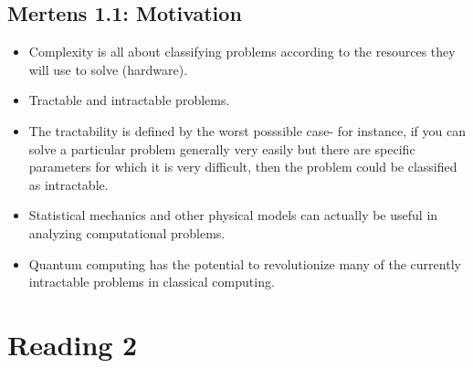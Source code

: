 \documentclass{article}
\begin{document}
\subsection{Mertens 1.1: Motivation}
\begin{itemize}
    \item Complexity is all about classifying problems according to the resources they will use to solve (hardware).
    \item Tractable and intractable problems.
    \item The tractability is defined by the worst posssible case- for instance, if you can solve a particular problem generally very easily but there are specific parameters for which it is very difficult, then the problem could be classified as intractable.
    \item Statistical mechanics and other physical models can actually be useful in analyzing computational problems.
    \item Quantum computing has the potential to revolutionize many of the currently intractable problems in classical computing.
\end{itemize}
\pagebreak

\section{Reading 2}
\end{document}
